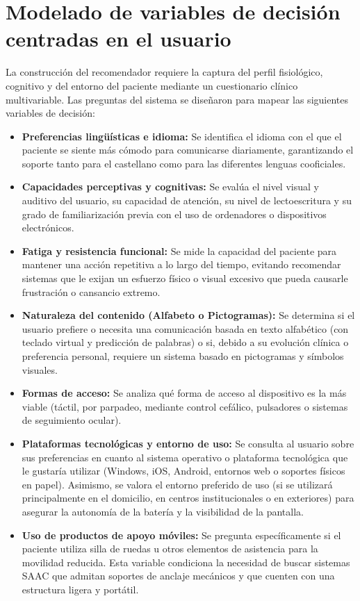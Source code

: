 \section{Modelado de variables de decisión centradas en el usuario}
La construcción del recomendador requiere la captura  del perfil fisiológico, cognitivo y del entorno del paciente mediante un cuestionario clínico multivariable. Las preguntas del sistema se diseñaron para mapear las siguientes variables de decisión:

\begin{itemize}
    	\item \textbf{Preferencias lingüísticas e idioma:} Se identifica el idioma con el que el paciente se siente más cómodo para comunicarse diariamente, garantizando el soporte tanto para el castellano como para las diferentes lenguas cooficiales.
    	\item \textbf{Capacidades perceptivas y cognitivas:} Se evalúa el nivel visual y auditivo del usuario, su capacidad de atención, su nivel de lectoescritura y su grado de familiarización previa con el uso de ordenadores o dispositivos electrónicos.
	\item \textbf{Fatiga y resistencia funcional:} Se mide la capacidad del paciente para mantener una acción repetitiva a lo largo del tiempo, evitando recomendar sistemas que le exijan un esfuerzo físico o visual excesivo que pueda causarle frustración o cansancio extremo.
    	\item \textbf{Naturaleza del contenido (Alfabeto o Pictogramas):} Se determina si el usuario prefiere o necesita una comunicación basada en texto alfabético (con teclado virtual y predicción de palabras) o si, debido a su evolución clínica o preferencia personal, requiere un sistema 		basado en pictogramas y símbolos visuales.
	\item \textbf{Formas de acceso:} Se analiza qué forma de acceso al dispositivo es la más viable (táctil, por parpadeo, mediante control cefálico, pulsadores o sistemas de seguimiento ocular).
    	\item \textbf{Plataformas tecnológicas y entorno de uso:} Se consulta al usuario sobre sus preferencias en cuanto al sistema operativo o plataforma tecnológica que le gustaría utilizar (Windows, iOS, Android, entornos web o soportes físicos en papel). Asimismo, se valora el entorno 	preferido de uso (si se utilizará principalmente en el domicilio, en centros institucionales o en exteriores) para asegurar la autonomía de la batería y la visibilidad de la pantalla.
	\item \textbf{Uso de productos de apoyo móviles:} Se pregunta específicamente si el paciente utiliza silla de ruedas u otros elementos de asistencia para la movilidad reducida. Esta variable condiciona la necesidad de buscar sistemas SAAC que admitan soportes de anclaje 				mecánicos y que cuenten con una estructura ligera y portátil.
\end{itemize}

